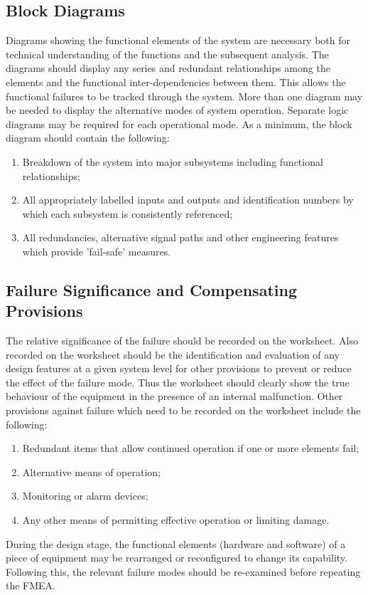 \documentclass[./dissertation.tex]{subfiles}
\begin{document}
\subsection{Block Diagrams}

Diagrams showing the functional elements of the
system are necessary both for technical understanding of the functions and the subsequent analysis. The diagrams should display any series and redundant relationships among the elements and the functional inter-dependencies between them. This allows the functional failures to be tracked through the system. More than one diagram may be needed to display the alternative modes of system operation. Separate logic diagrams may be required for each operational mode. As a minimum, the block diagram should contain the following:

\begin{enumerate}
\item Breakdown of the system into major subsystems including functional relationships;
\item All appropriately labelled inputs and outputs and identification numbers by which each subsystem is consistently referenced;
\item All redundancies, alternative signal paths and other engineering features which provide 'fail-safe' measures.
\end{enumerate}

\subsection{Failure Significance and Compensating Provisions}

The relative significance of the failure should be recorded on the worksheet. Also recorded on the worksheet should be the identification and evaluation of any design features at a given system level for other provisions to prevent or reduce the effect of the failure mode. Thus the worksheet should clearly show the true behaviour of the equipment in the presence of an internal malfunction. Other provisions against failure which need to be recorded on the worksheet include the following:

\begin{enumerate}
\item Redundant items that allow continued operation if one or more elements fail;
\item Alternative means of operation;
\item Monitoring or alarm devices;
\item Any other means of permitting effective operation or limiting damage.
\end{enumerate}

During the design stage, the functional elements (hardware and software) of a piece of equipment may be rearranged or reconfigured to change its capability. Following this, the relevant failure modes should be re-examined before repeating the FMEA.
\end{document}
